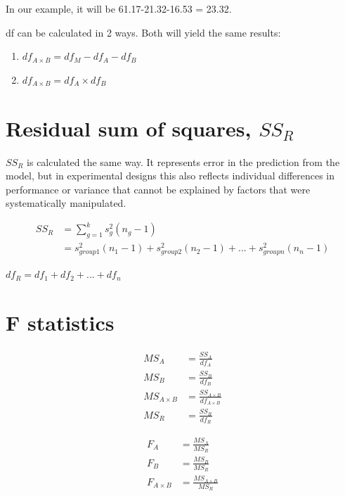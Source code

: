 In our example, it will be 61.17-21.32-16.53 = 23.32.

df can be calculated in 2 ways. Both will yield the same results:
\begin{enumerate}
\item $df_{A \times B} = df_M - df_A - df_B$
\item $df_{A \times B} = df_A \times df_B$
\end{enumerate}

\section{Residual sum of squares, $SS_R$}
$SS_R$ is calculated the same way. It represents error in the prediction from the model, but in experimental designs this also reflects individual differences in performance or variance that cannot be explained by factors that were systematically manipulated.

\begin{equation}
\begin{split}
SS_R & = \sum^k_{g=1} s^2_g (n_g - 1) \\
& = s^2_{group1}(n_1-1) + s^2_{group2}(n_2-1) + ... + s^2_{groupn}(n_n-1)
\end{split}
\end{equation}

$df_R = df_1 + df_2 + ... + df_n$

\section{F statistics}
\begin{equation}
\begin{split}
MS_A &= \frac{SS_A}{df_A}\\
MS_B &= \frac{SS_B}{df_B}\\
MS_{A \times B} &= \frac{SS_{A \times B}}{df_{A \times B}}\\
MS_R &= \frac{SS_R}{df_R}
\end{split}
\end{equation}

\begin{equation}
\begin{split}
F_A &= \frac{MS_A}{MS_R}\\
F_B &= \frac{MS_B}{MS_R}\\
F_{A \times B} &= \frac{MS_{A \times B}}{MS_R}\\
\end{split}
\end{equation}